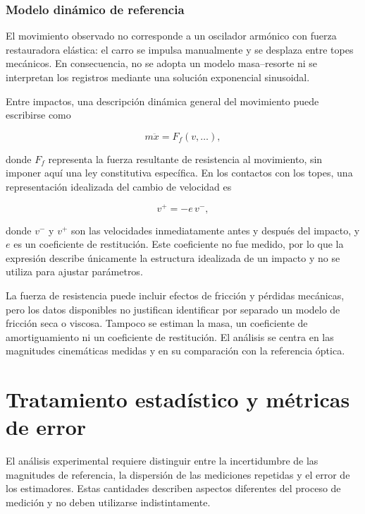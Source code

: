 \subsubsection{Modelo dinámico de referencia}

El movimiento observado no corresponde a un
oscilador armónico con fuerza restauradora
elástica: el carro se impulsa manualmente y se
desplaza entre topes mecánicos. En consecuencia,
no se adopta un modelo masa--resorte ni se
interpretan los registros mediante una solución
exponencial sinusoidal.

Entre impactos, una descripción dinámica general
del movimiento puede escribirse como

\begin{equation}
    m\ddot{x}=F_f(v,\ldots),
    \label{eq:dinamica_libre_exp03}
\end{equation}

donde $F_f$ representa la fuerza resultante de
resistencia al movimiento, sin imponer aquí una
ley constitutiva específica. En los contactos
con los topes, una representación idealizada
del cambio de velocidad es

\begin{equation}
    v^{+}=-e\,v^{-},
    \label{eq:impacto_exp03}
\end{equation}

donde $v^{-}$ y $v^{+}$ son las velocidades
inmediatamente antes y después del impacto, y
$e$ es un coeficiente de restitución. Este
coeficiente no fue medido, por lo que la
expresión describe únicamente la estructura
idealizada de un impacto y no se utiliza para
ajustar parámetros.

La fuerza de resistencia puede incluir efectos
de fricción y pérdidas mecánicas, pero los datos
disponibles no justifican identificar por separado
un modelo de fricción seca o viscosa. Tampoco
se estiman la masa, un coeficiente de
amortiguamiento ni un coeficiente de restitución.
El análisis se centra en las magnitudes
cinemáticas medidas y en su comparación con
la referencia óptica.

\section{Tratamiento estadístico y métricas de error}
\label{sec:tratamiento_datos_error}

El análisis experimental requiere distinguir entre
la incertidumbre de las magnitudes de referencia,
la dispersión de las mediciones repetidas y el
error de los estimadores. Estas cantidades describen
aspectos diferentes del proceso de medición y no
deben utilizarse indistintamente.


